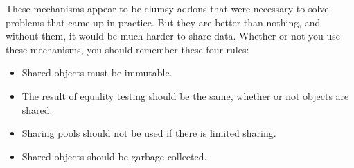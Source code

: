 These mechanisms appear to be clumsy addons that were necessary to solve
problems that came up in practice. But they are better than nothing, and
without them, it would be much harder to share data. 
Whether or not you use these mechanisms, you should remember these four rules:
\begin{itemize}
  \item Shared objects must be immutable.
  \item The result of equality testing should be the same, whether or
not objects are shared.  
  \item Sharing pools should not be used if there is limited sharing.
  \item Shared objects should be garbage collected.
\end{itemize}





